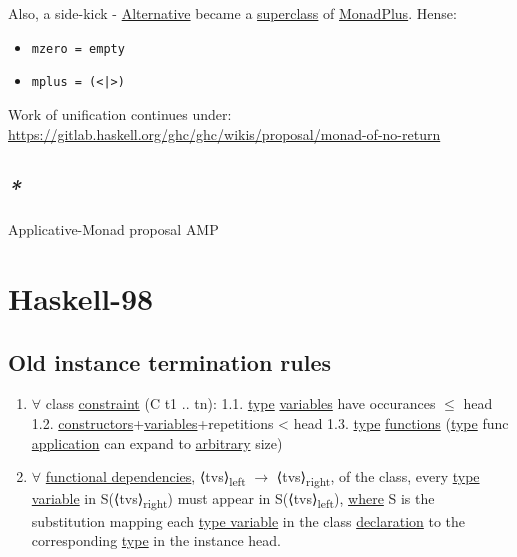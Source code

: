 \documentclass[a4paper,14pt,oneside]{book}
\begin{document}
Also, a side-kick - \hyperref[org8a56ee3]{Alternative} became a \hyperref[org4f60466]{superclass} of \hyperref[orga84253e]{MonadPlus}. Hense:
\begin{itemize}
\item \texttt{mzero = empty}
\item \texttt{mplus = (<|>)}
\end{itemize}

Work of unification continues under: \url{https://gitlab.haskell.org/ghc/ghc/wikis/proposal/monad-of-no-return}

\section{\emph{*}}
\label{sec:org5fdaca6}

\label{orgabf8ea7}Applicative-Monad proposal
\label{orgd4d1672}AMP

\chapter{Haskell-98}
\label{sec:org54ebb39}

\section{\label{org67a7004}Old instance termination rules}
\label{sec:org455d92f}

\begin{enumerate}
\item \(\forall\) class \hyperref[org162340e]{constraint} (C t1 .. tn):
1.1. \hyperref[org5b55790]{type} \hyperref[org6a89320]{variables} have occurances \(\le\) head
1.2. \hyperref[org1ad05e8]{constructors}+\hyperref[org6a89320]{variables}+repetitions < head
1.3. \textlnot{} \hyperref[org5b55790]{type} \hyperref[org6a935e2]{functions} (\hyperref[org5b55790]{type} func \hyperref[org09b56ce]{application} can expand to \hyperref[org0ca8c65]{arbitrary} size)
\item \(\forall\) \hyperref[org8df7854]{functional dependencies}, ⟨tvs⟩\textsubscript{left} \(\to\) ⟨tvs⟩\textsubscript{right}, of the class, every \hyperref[orgc5d7afd]{type variable} in S(⟨tvs⟩\textsubscript{right}) must appear in S(⟨tvs⟩\textsubscript{left}), \hyperref[org7660a8e]{where} S is the substitution mapping each \hyperref[orgc5d7afd]{type variable} in the class \hyperref[orgaf8e501]{declaration} to the corresponding \hyperref[org5b55790]{type} in the instance head.
\end{enumerate}
\end{document}
